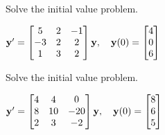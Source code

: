 \documentclass{ximera}
\begin{document}
 \begin{problem}\label{exer:10.6.21}
 Solve the initial value problem.
 
$ {\bf y}'= \begin{bmatrix}5&2&-1\\-3&2&2\\1&3&2\end{bmatrix}{\bf y},\quad {\bf
y}(0)= \begin{bmatrix}4\\0\\6\end{bmatrix}$
\end{problem}

 \begin{problem}\label{exer:10.6.22}
 Solve the initial value problem.
 
$ {\bf y}'= \begin{bmatrix}4&4&0\\8&10&-20\\2&3&-2\end{bmatrix}{\bf y},\quad {\bf
y}(0)= \begin{bmatrix}8\\6\\5\end{bmatrix}$


\end{problem}
\end{document}
